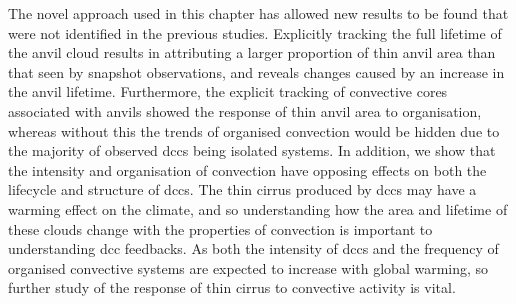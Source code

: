 

 
The novel approach used in this chapter has allowed new results to be found that were not identified in the previous studies.
Explicitly tracking the full lifetime of the anvil cloud results in attributing a larger proportion of thin anvil area than that seen by snapshot observations, and reveals changes caused by an increase in the anvil lifetime.
Furthermore, the explicit tracking of convective cores associated with anvils showed the response of thin anvil area to organisation, whereas without this the trends of organised convection would be hidden due to the majority of observed \acrshort{dcc}s being isolated systems.
In addition, we show that the intensity and organisation of convection have opposing effects on both the lifecycle and structure of \acrshort{dcc}s. 
The thin cirrus produced by \acrshort{dcc}s may have a warming effect on the climate, and so understanding how the area and lifetime of these clouds change with the properties of convection is important to understanding \acrshort{dcc} feedbacks. 
As both the intensity of \acrshort{dcc}s and the frequency of organised convective systems are expected to increase with global warming, so further study of the response of thin cirrus to convective activity is vital.

